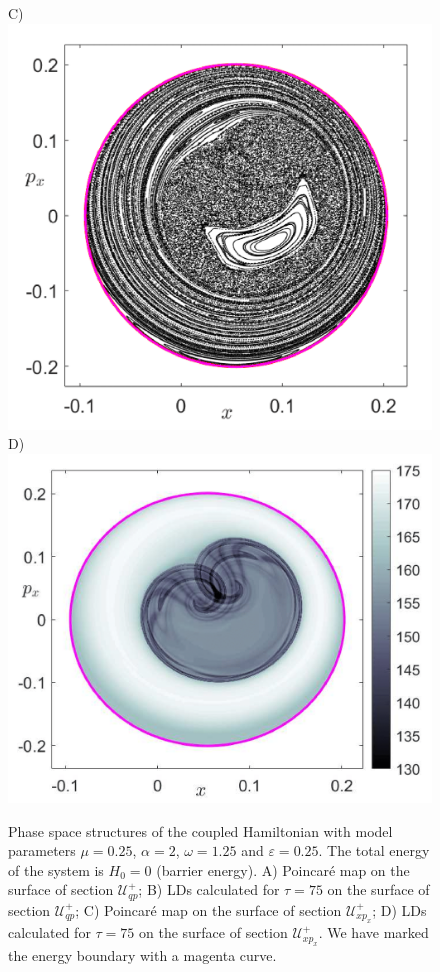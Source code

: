\documentclass[8pt]{article}
\begin{document}
\begin{figure}[!ht]
\begin{center}
		C)\includegraphics[scale=0.12]{fig10c.png}
		D)\includegraphics[scale=0.12]{fig10d.png}
	\end{center}
	\caption{Phase space structures of the coupled Hamiltonian with model parameters $\mu = 0.25$, $\alpha = 2$, $\omega = 1.25$ and $\varepsilon = 0.25$. The total energy of the system is $H_0 = 0$ (barrier energy). A) Poincar\'e map on the surface of section $\mathcal{U}^{+}_{qp}$; B) LDs calculated for $\tau = 75$ on the surface of section $\mathcal{U}^{+}_{qp}$; C) Poincar\'e map on the surface of section $\mathcal{U}^{+}_{xp_x}$; D) LDs calculated for $\tau = 75$ on the surface of section $\mathcal{U}^{+}_{xp_x}$. We have marked the energy boundary with a magenta curve.}
	\label{fig:ps_vs_ld_1}
\end{figure}
\end{document}
